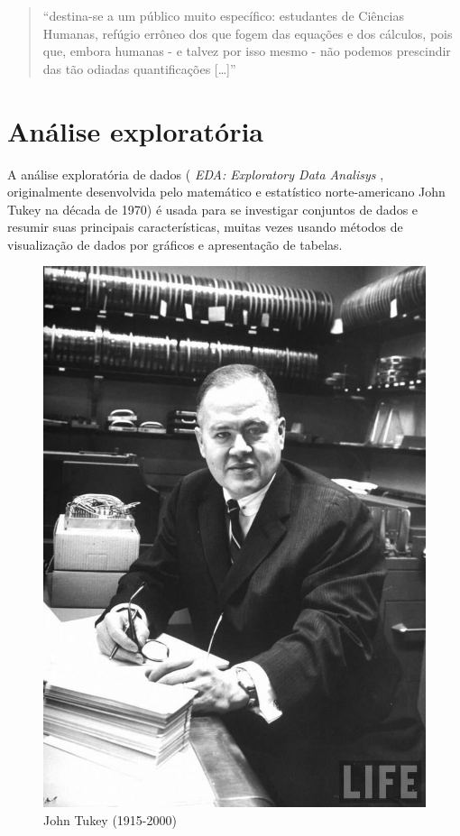 \documentclass[
]{book}
\begin{document}
\hfill\break

\begin{quote}
``destina-se a um público muito específico: estudantes de Ciências Humanas, refúgio errôneo dos que fogem das equações e dos cálculos, pois que, embora humanas - e talvez por isso mesmo - não podemos prescindir das tão odiadas quantificações {[}\ldots{]}''
\end{quote}

\hfill\break

\hypertarget{anuxe1lise-exploratuxf3ria}{%
\section{Análise exploratória}\label{anuxe1lise-exploratuxf3ria}}

\hfill\break

A análise exploratória de dados ( \emph{EDA: Exploratory Data Analisys} , originalmente desenvolvida pelo matemático e estatístico norte-americano John Tukey na década de 1970) é usada para se investigar conjuntos de dados e resumir suas principais características, muitas vezes usando métodos de visualização de dados por gráficos e apresentação de tabelas.

\hfill\break

\begin{figure}

{\centering \includegraphics[width=0.5\linewidth]{images3/tukey} 

}

\caption{John Tukey (1915-2000)}\label{fig:unnamed-chunk-13}
\end{figure}
\end{document}
